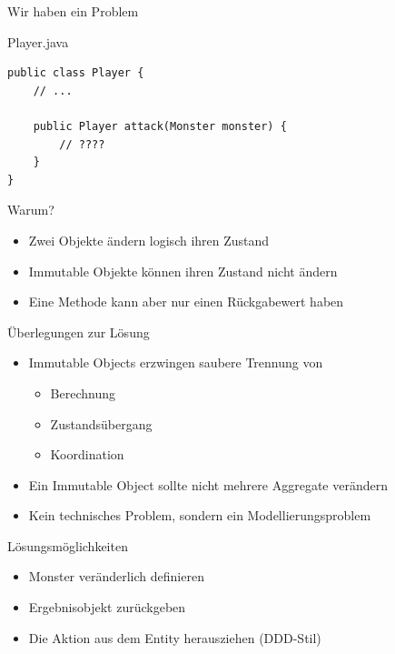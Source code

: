 \begin{frame}[fragile]{Wir haben ein Problem}
    \begin{alertblock}{Player.java}
        \begin{lstlisting}
public class Player {
	// ...

    public Player attack(Monster monster) {
    	// ????
    }
}        
        \end{lstlisting}
    \end{alertblock}
    \begin{alertblock}{Warum?}
    	\begin{itemize}
    	  \item Zwei Objekte ändern logisch ihren Zustand
    	  \item Immutable Objekte können ihren Zustand nicht ändern
    	  \item Eine Methode kann aber nur einen Rückgabewert haben
    	\end{itemize}
    \end{alertblock}
\end{frame}

\begin{frame}{Überlegungen zur Lösung}
	\begin{itemize}
	  \item Immutable Objects erzwingen saubere Trennung von
	  	\begin{itemize}
	  	  \item Berechnung
	  	  \item Zustandsübergang
	  	  \item Koordination
	  	\end{itemize}
	  \item Ein Immutable Object sollte nicht mehrere Aggregate verändern
	  \item Kein technisches Problem, sondern ein Modellierungs­problem
	\end{itemize}
\end{frame}

\begin{frame}{Lösungsmöglichkeiten}
	\begin{itemize}
	  \item Monster veränderlich definieren
	  \item Ergebnisobjekt zurückgeben
	  \item Die Aktion aus dem Entity herausziehen (DDD-Stil)
	\end{itemize}
\end{frame}

